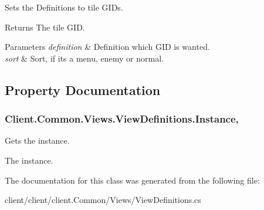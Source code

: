 Sets the Definitions to tile G\+I\+Ds. 

\begin{DoxyReturn}{Returns}
The tile G\+I\+D.
\end{DoxyReturn}

\begin{DoxyParams}{Parameters}
{\em definition} & Definition which G\+I\+D is wanted.\\
\hline
{\em sort} & Sort, if it\textquotesingle{}s a menu, enemy or normal.\\
\hline
\end{DoxyParams}


\subsection{Property Documentation}
\hypertarget{classClient_1_1Common_1_1Views_1_1ViewDefinitions_a50a6b5a1d17e54b4de44ab983b8d4810}{}
\subsubsection[{Instance}]{ Client.\+Common.\+Views.\+View\+Definitions.\+Instance\hspace{0.3cm}{\ttfamily [static]}, {\ttfamily [get]}}\label{classClient_1_1Common_1_1Views_1_1ViewDefinitions_a50a6b5a1d17e54b4de44ab983b8d4810}


Gets the instance. 

The instance.

The documentation for this class was generated from the following file\+:\begin{DoxyCompactItemize}
\item 
client/client/client.\+Common/\+Views/View\+Definitions.\+cs\end{DoxyCompactItemize}
